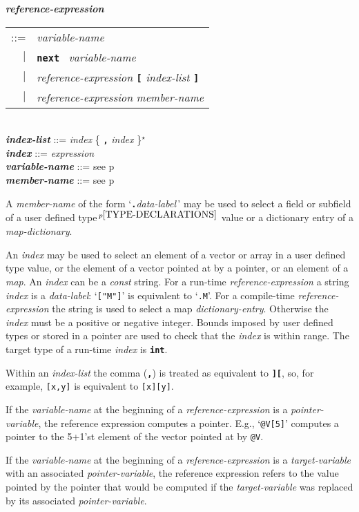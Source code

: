\documentclass[12pt]{article}
\newcommand{\TT}[1]{{\tt \bfseries #1}}
\newcommand{\STAR}{{\Large $^\star$}}
\newcommand{\emkey}[1]{{\em \bfseries #1}}
\newcommand{\pagref}[1]{p\pageref{#1}}
\newcommand{\pagnote}[1]{$\,^{p\pageref{#1}}$}
\newenvironment{indpar}[1][0.3in]%
	{\begin{list}{}%
		     {\setlength{\itemsep}{0in}%
		      \setlength{\topsep}{0in}%
		      \setlength{\parsep}{1ex}%
		      \setlength{\labelwidth}{#1}%
		      \setlength{\leftmargin}{#1}%
		      \addtolength{\leftmargin}{\labelsep}}%
	 \item}%
	{\end{list}}
\begin{document}
\begin{indpar}
\emkey{reference-expression}
    \begin{tabular}[t]{rl}
    ::= & {\em variable-name} \\
    $|$ & \TT{next}~ {\em variable-name} \\
    $|$ & {\em reference-expression} \TT{[} {\em index-list} \TT{]} \\
    $|$ & {\em reference-expression} {\em member-name} \\
    \end{tabular}
\\[0.5ex]
\emkey{index-list} ::= {\em index} \{ \TT{,} {\em index} \}\STAR{}
\\[0.5ex]
\emkey{index}\label{REFERENCE-INDEX}
    ::= {\em expression}
\\[0.5ex]
\emkey{variable-name} ::= see \pagref{VARIABLE-NAME}
\\[0.5ex]
\emkey{member-name} ::= see \pagref{MEMBER-NAME}
\end{indpar}

A {\em member-name} of the form `\TT{.}{\em data-label}\,'
may be used to select a field or subfield\label{FIELD-SELECTION}
of a user defined type\pagnote{TYPE-DECLARATIONS} value or
a dictionary entry of a {\em map-dictionary}.

An {\em index} may be used to select an element of a vector
or array in a
user defined type value, or the
element of a vector pointed at by a pointer, or an element
of a {\em map}.  An {\em index} can be a {\em const}
string.  For a run-time {\em reference-expression} a string
{\em index} is a {\em data-label}: `{\tt ["M"]}' is equivalent
to `{\tt .M}'.  For a compile-time {\em reference-expression}
the string is used to select a map {\em dictionary-entry}.
Otherwise the
{\em index} must be a positive or negative integer.  Bounds imposed
by user defined types or stored in a pointer are used to
check that the {\em index} is within range.
The target type of a run-time {\em index} is \TT{int}.


Within an {\em index-list} the comma (\TT{,}) is treated
as equivalent to \TT{][}, so, for example, {\tt [x,y]}
is equivalent to {\tt [x][y]}.

If the {\em variable-name} at the beginning of a {\em reference-expression}
is a {\em pointer-variable}, the reference expression computes a pointer.
E.g., `{\tt @V[5]}' computes a pointer to the 5+1'st element of the
vector pointed at by {\tt @V}.

If the {\em variable-name} at the beginning of a {\em reference-expression}
is a {\em target-variable} with an associated {\em pointer-variable},
the reference expression refers to the value pointed by the pointer
that would be computed if the {\em target-variable} was replaced by
its associated {\em pointer-variable}.
\end{document}

